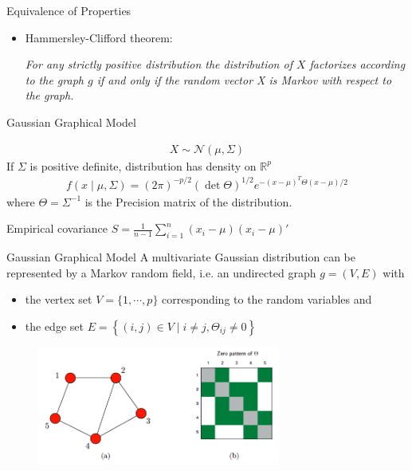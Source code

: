 \documentclass{beamer}
\begin{document}
\begin{frame}{Equivalence of Properties}
\begin{itemize}
	\item Hammersley-Clifford theorem: \begin{center}
		\textit{For any strictly positive distribution the distribution of $X$ factorizes according to the graph $g$ if and only if the random vector X is Markov with respect to the graph.} \cite{hastie2015statistical}
	\end{center}
\end{itemize}
\end{frame}


\begin{frame}{Gaussian Graphical Model}
\begin{center}
		\begin{tcolorbox}[width = 4.5in, boxsep = 0pt,
			left = 2pt, right = 2pt, top = 2pt]
			\begin{align*}
			X \sim \mathcal{N}(\mu, \Sigma)
			\end{align*}
			If $\Sigma$ is positive definite, distribution has density on $\mathbb{R}^{p}$
\begin{align*}
	f(x \mid \mu, \Sigma)=(2 \pi)^{-p / 2}(\operatorname{det} \Theta)^{1 / 2} e^{-(x-\mu)^{T} \Theta(x-\mu) / 2}
\end{align*}
where $\Theta=\Sigma^{-1}$ is the Precision matrix of the distribution.
		\end{tcolorbox}	
\end{center}

Empirical covariance $S = \frac{1}{n-1} \sum_{i=1}^{n}\left(x_{i}-\mu\right)\left(x_{i}-\mu\right)'$

\end{frame}

\begin{frame}{Gaussian Graphical Model}
	A multivariate Gaussian distribution can be represented by a Markov random field, i.e. an undirected graph $g = (V, E)$ with
	\begin{itemize}
		\item the vertex set $V = \{1, \cdots, p \}$ corresponding to the random variables and
		\item the edge set $E = \left\{(i, j) \in V \mid i \neq j, \Theta_{i j} \neq 0\right\}$
	\end{itemize}
	\begin{figure}
		\includegraphics[trim={0 2cm 0 0}, clip,width = 8cm]{IntroGraphMat}
	\end{figure}
\end{frame}
\end{document}
